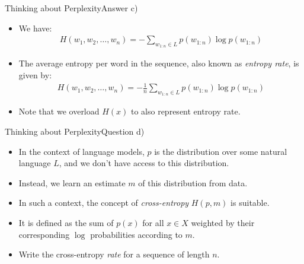 \documentclass[t]{beamer}
\begin{document}
\begin{frame}{Thinking about Perplexity}{Answer c)}
    \begin{itemize}
        \item We have:
              \begin{align*}
                  H(w_1,w_2,\ldots,w_n) = -\sum_{w_{1:n}\in L} p(w_{1:n})\log p(w_{1:n})
              \end{align*}
        \item The average entropy per word in the sequence, also known as
              \emph{entropy rate}, is given by:
              \begin{align*}
                  H(w_1,w_2,\ldots,w_n) = -\frac{1}{n}\sum_{w_{1:n}\in L} p(w_{1:n})\log p(w_{1:n})
              \end{align*}
        \item Note that we overload $H(x)$ to also represent entropy rate.
    \end{itemize}
\end{frame}

\begin{frame}{Thinking about Perplexity}{Question d)}
    \begin{itemize}
        \item In the context of language models, $p$ is the distribution over
              some natural language $L$, and we don't have access to this
              distribution.
        \item Instead, we learn an estimate $m$ of this distribution from data.
        \item In such a context, the concept of \emph{cross-entropy} $H(p,m)$ is
              suitable.
        \item It is defined as the sum of $p(x)$ for all $x\in X$ weighted by
              their corresponding $\log$ probabilities according to $m$.
        \item Write the cross-entropy \emph{rate} for a sequence of length $n$.
    \end{itemize}
\end{frame}
\end{document}
